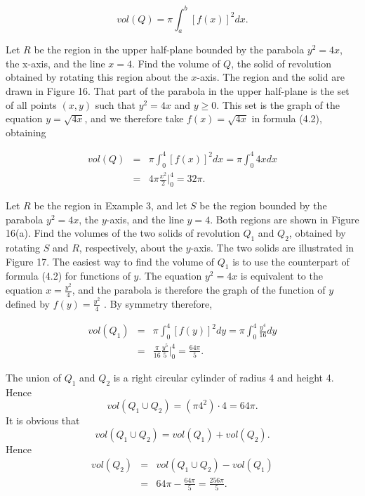 \begin{theorem} %
$$
vol(Q) = \pi \int_a^b [f(x)]^2 dx.  
$$
\end{theorem}


\begin{example}
Let $R$ be the region in the upper half-plane bounded by the parabola $y^2 = 4x$, the x-axis, and the line $x = 4$. Find the volume of $Q$, the solid of revolution obtained by rotating this region about the $x$-axis. The region and the solid are drawn in Figure 16. That part of the parabola in the upper half-plane is the set of all points $(x, y)$ such that $y^2 = 4x$ and $y \geq 0$. This set is the graph of the equation $y= \sqrt {4x}$, and we therefore take $f(x) = \sqrt {4x}$ in formula (4.2), obtaining

\begin{eqnarray*}
vol(Q) &=& \pi \int_0^4 [f(x)]^2 dx = \pi \int_0^4 4xdx \\
           &=& 4\pi \frac{x^2}{2} \big|_0^4 = 32\pi .
\end{eqnarray*}
\end{example}

\begin{example}
Let $R$ be the region in Example 3, and let $S$ be the region bounded by the parabola $y^2 = 4x$, the $y$-axis, and the line $y = 4$. Both regions are shown in Figure 16(a). Find the volumes of the two solids of revolution $Q_1$ and $Q_2$, obtained by rotating $S$ and $R$, respectively, about the $y$-axis. The two solids are illustrated in Figure 17. The easiest way to find the volume of $Q_1$ is to use the counterpart of formula (4.2) for functions of $y$. The equation $y^2 = 4x$ is equivalent to the equation $x = \frac{y^2}{4}$, and the parabola is therefore the graph of the function of $y$ defined by $f(y) = \frac{y^2}{4}$ . By symmetry therefore, 

\begin{eqnarray*}
vol(Q_1) &=& \pi \int_0^4 [f(y)]^2 dy = \pi \int_0^4 \frac{y^4}{16} dy \\
               &=& \frac{\pi}{16} \frac{y^5}{5} \big|_0^4 = \frac{64 \pi}{5} .
\end{eqnarray*}

The union of $Q_1$ and $Q_2$ is a right circular cylinder of radius 4 and height 4. Hence
$$
vol(Q_1 \cup Q_2) = (\pi 4^2) \cdot 4 = 64 \pi.
$$
\noindent It is obvious that
$$
vol(Q_1 \cup Q_2) = vol(Q_1) + vol(Q_2).
$$
\noindent Hence 
\begin{eqnarray*}
vol(Q_2) &=& vol(Q_1 \cup Q_2) - vol(Q_1) \\
               &=& 64 \pi - \frac{64\pi}{5} = \frac{256 \pi}{5} .
\end{eqnarray*}
\end{example}

